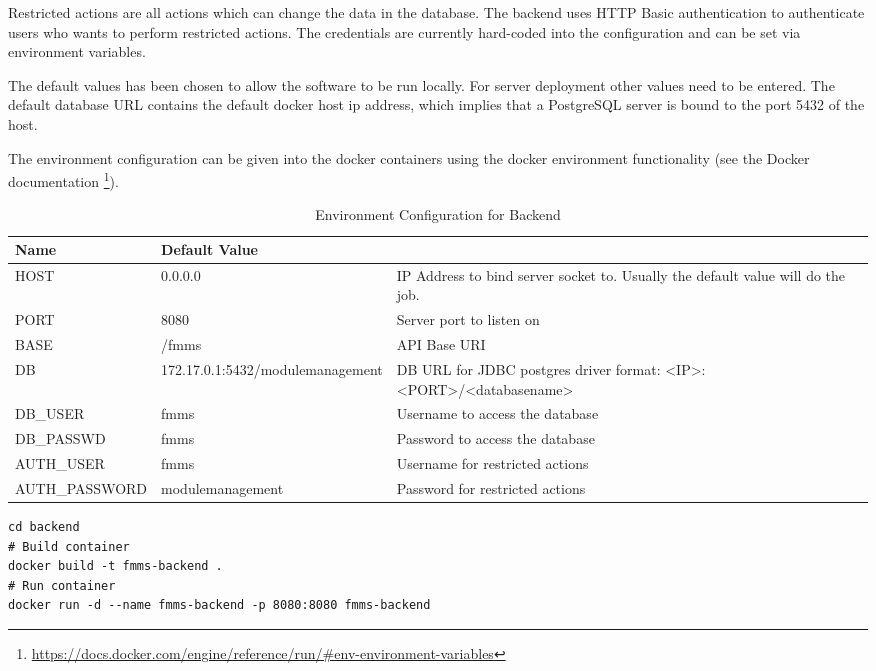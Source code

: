 Restricted actions are all actions which can change the data in the database. The backend uses HTTP Basic authentication to authenticate users who wants to perform restricted actions. The credentials are currently hard-coded into the configuration and can be set via environment variables.

The default values has been chosen to allow the software to be run locally. For server deployment other values need to be entered.
The default database URL contains the default docker host ip address, which implies that a PostgreSQL server is bound to the port 5432 of the host.

The environment configuration can be given into the docker containers using the docker environment functionality (see the Docker documentation \footnote{\url{https://docs.docker.com/engine/reference/run/\#env-environment-variables}}). 

\begin{minipage}{\textwidth}
\begin{table}[H]
	\renewcommand{\arraystretch}{1.2}
	\centering
	\begin{tabularx}{\textwidth}{|l|l|X|}
		\hline
		\textbf{Name} & \textbf{Default Value} &  \\ \hline
		HOST & 0.0.0.0 & IP Address to bind server socket to. Usually the default value will do the job. \\ \hline
		PORT & 8080 & Server port to listen on \\ \hline
		BASE & /fmms & API Base URI \\ \hline
		DB & 172.17.0.1:5432/modulemanagement & DB URL for JDBC postgres driver format: <IP>:<PORT>/<databasename> \\ \hline
		DB\_USER & fmms & Username to access the database \\ \hline
		DB\_PASSWD & fmms & Password to access the database \\ \hline
		AUTH\_USER & fmms & Username for restricted actions \\ \hline
		AUTH\_PASSWORD & modulemanagement & Password for restricted actions \\ \hline
	\end{tabularx}
	\caption{Environment Configuration for Backend}
	\label{backend-env}
\end{table}
\end{minipage}

\begin{minipage}{\textwidth}
\begin{lstlisting}[caption={Build Backend Container}]
cd backend
# Build container
docker build -t fmms-backend .
# Run container
docker run -d --name fmms-backend -p 8080:8080 fmms-backend
\end{lstlisting}
\end{minipage}


